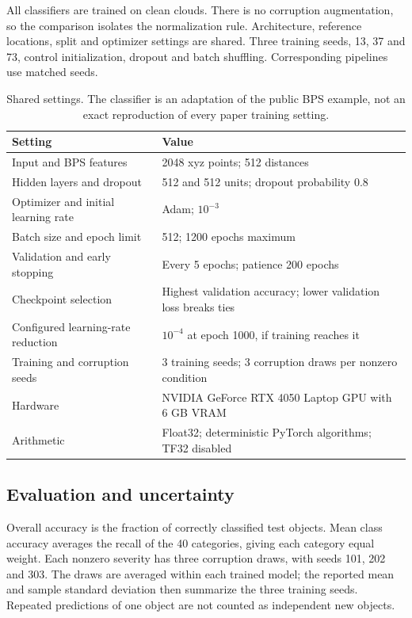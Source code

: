 \documentclass[11pt,a4paper]{article}
\begin{document}
All classifiers are trained on clean clouds. There is no corruption augmentation, so the comparison isolates the normalization rule. Architecture, reference locations, split and optimizer settings are shared. Three training seeds, 13, 37 and 73, control initialization, dropout and batch shuffling. Corresponding pipelines use matched seeds.

\begin{table}[!ht]\centering\small
\begin{tabular}{L{65mm}L{83mm}}
\toprule Setting & Value\\\midrule
Input and BPS features & 2048 xyz points; 512 distances\\
Hidden layers and dropout & 512 and 512 units; dropout probability 0.8\\
Optimizer and initial learning rate & Adam; $10^{-3}$\\
Batch size and epoch limit & 512; 1200 epochs maximum\\
Validation and early stopping & Every 5 epochs; patience 200 epochs\\
Checkpoint selection & Highest validation accuracy; lower validation loss breaks ties\\
Configured learning-rate reduction & $10^{-4}$ at epoch 1000, if training reaches it\\
Training and corruption seeds & 3 training seeds; 3 corruption draws per nonzero condition\\
Hardware & NVIDIA GeForce RTX 4050 Laptop GPU with 6 GB VRAM\\
Arithmetic & Float32; deterministic PyTorch algorithms; TF32 disabled\\
\bottomrule
\end{tabular}
\caption{Shared settings. The classifier is an adaptation of the public BPS example, not an exact reproduction of every paper training setting.}
\end{table}

\subsection{Evaluation and uncertainty}
Overall accuracy is the fraction of correctly classified test objects. Mean class accuracy averages the recall of the 40 categories, giving each category equal weight. Each nonzero severity has three corruption draws, with seeds 101, 202 and 303. The draws are averaged within each trained model; the reported mean and sample standard deviation then summarize the three training seeds. Repeated predictions of one object are not counted as independent new objects.
\end{document}
